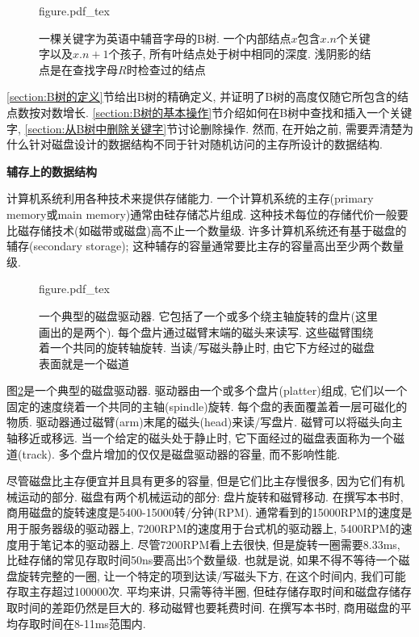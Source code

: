 \documentclass[oneside,10pt,fontset=none]{ctexbook}
\numberwithin{definition}{chapter}
\numberwithin{theorem}{chapter}
\numberwithin{lemma}{chapter}
\begin{document}
\begin{figure}[htbp]
    \centering
    \def\svgwidth{\columnwidth}
    {figure.pdf_tex}
    \caption{一棵关键字为英语中辅音字母的B树. 一个内部结点$x$包含$x.n$个关键字以及$x.n+1$个孩子, 所有叶结点处于树中相同的深度. 浅阴影的结点是在查找字母$R$时检查过的结点}
    \label{fig:英语字母辅音的B树示意图}
\end{figure}

\ref{section:B树的定义}节给出B树的精确定义, 并证明了B树的高度仅随它所包含的结点数按对数增长. \ref{section:B树的基本操作}节介绍如何在B树中查找和插入一个关键字, \ref{section:从B树中删除关键字}节讨论删除操作. 然而, 在开始之前, 需要弄清楚为什么针对磁盘设计的数据结构不同于针对随机访问的主存所设计的数据结构.

\textbf{辅存上的数据结构}

计算机系统利用各种技术来提供存储能力. 一个计算机系统的主存(primary memory或main memory)通常由硅存储芯片组成. 这种技术每位的存储代价一般要比磁存储技术(如磁带或磁盘)高不止一个数量级. 许多计算机系统还有基于磁盘的辅存(secondary storage); 这种辅存的容量通常要比主存的容量高出至少两个数量级.

\begin{figure}[htbp]
    \centering
    \def\svgwidth{\columnwidth}
    {figure.pdf_tex}
    \caption{一个典型的磁盘驱动器. 它包括了一个或多个绕主轴旋转的盘片(这里画出的是两个). 每个盘片通过磁臂末端的磁头来读写. 这些磁臂围绕着一个共同的旋转轴旋转. 当读/写磁头静止时, 由它下方经过的磁盘表面就是一个磁道}
    \label{fig:磁盘结构}
\end{figure}

图\ref{fig:磁盘结构}是一个典型的磁盘驱动器. 驱动器由一个或多个盘片(platter)组成, 它们以一个固定的速度绕着一个共同的主轴(spindle)旋转. 每个盘的表面覆盖着一层可磁化的物质. 驱动器通过磁臂(arm)末尾的磁头(head)来读/写盘片. 磁臂可以将磁头向主轴移近或移远. 当一个给定的磁头处于静止时, 它下面经过的磁盘表面称为一个磁道(track). 多个盘片增加的仅仅是磁盘驱动器的容量, 而不影响性能.

尽管磁盘比主存便宜并且具有更多的容量, 但是它们比主存慢很多, 因为它们有机械运动的部分. 磁盘有两个机械运动的部分: 盘片旋转和磁臂移动. 在撰写本书时, 商用磁盘的旋转速度是5400-15000转/分钟(RPM). 通常看到的15000RPM的速度是用于服务器级的驱动器上, 7200RPM的速度用于台式机的驱动器上, 5400RPM的速度用于笔记本的驱动器上. 尽管7200RPM看上去很快, 但是旋转一圈需要8.33ms, 比硅存储的常见存取时间50ns要高出5个数量级. 也就是说, 如果不得不等待一个磁盘旋转完整的一圈, 让一个特定的项到达读/写磁头下方, 在这个时间内, 我们可能存取主存超过100000次. 平均来讲, 只需等待半圈, 但硅存储存取时间和磁盘存储存取时间的差距仍然是巨大的. 移动磁臂也要耗费时间. 在撰写本书时, 商用磁盘的平均存取时间在8-11ms范围内.
\end{document}

